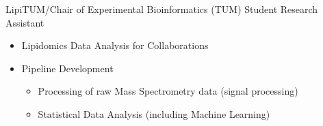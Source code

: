 {%
	LipiTUM/Chair of Experimental Bioinformatics (TUM)
}
{%
	Student Research Assistant
}
{%
	\vspace*{.07cm}
	\begin{itemize}
		\item Lipidomics Data Analysis for Collaborations
		\item Pipeline Development
		\begin{itemize}
			\item Processing of raw Mass Spectrometry data (signal processing)
			\item Statistical Data Analysis (including Machine Learning)
		\end{itemize}
	\end{itemize}
}
